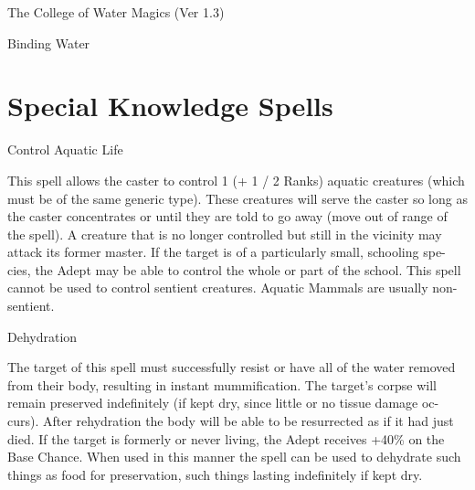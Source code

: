 \begin{Chapter}{The College of Water Magics (Ver 1.3)}
\begin{ritual}[Q-1]{Binding Water }
\begin{effects}
\end{effects}
\end{ritual}

\section{Special Knowledge Spells}

\begin{spell}[S-1]{Control Aquatic Life }

\begin{effects}
This spell allows the caster to control 1 (+ 
1  /  2  Ranks)  aquatic  creatures  (which  must  be  of 
the  same  generic  type).  These  creatures  will  serve 
the caster so long as the caster concentrates or until 
they are told to go away (move out of range of the 
spell).  A  creature  that  is  no  longer  controlled  but 
still in the vicinity may attack its former master. If 
the target is of a particularly small, schooling spe-
cies, the Adept may be able to control the whole or 
part  of  the  school.  This  spell  cannot  be  used  to 
control  sentient  creatures.  Aquatic  Mammals  are 
usually non-sentient. 

\end{effects}
\end{spell}

\begin{spell}[S-2]{Dehydration }

\begin{effects}
 The  target  of  this  spell  must  successfully 
resist  or  have  all  of  the  water  removed  from  their 
body,  resulting  in  instant  mummification.  The 
target’s  corpse  will  remain  preserved  indefinitely 
(if  kept  dry,  since  little  or  no  tissue  damage  oc-
curs). After rehydration the body will be able to be 
resurrected  as  if  it  had  just  died.  If  the  target  is 
formerly or never living, the Adept receives +40\% 
on the Base Chance. When used in this manner the 
spell can be used to dehydrate such things as food 
for  preservation,  such  things  lasting  indefinitely  if 
kept dry. 

\end{effects}
\end{spell}


\end{Chapter}

